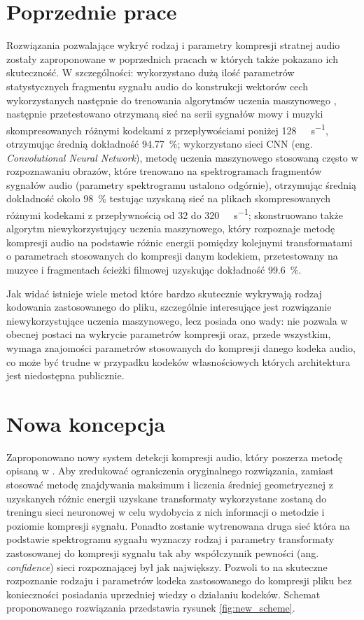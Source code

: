 \documentclass[12pt]{oska}
\let\Oldsection\section
\renewcommand{\section}{\FloatBarrier\Oldsection}
\begin{document}
\section{Poprzednie prace}
Rozwiązania pozwalające wykryć rodzaj i parametry kompresji stratnej audio
zostały zaproponowane w poprzednich pracach w których także pokazano
ich skuteczność. W szczególności: wykorzystano dużą ilość parametrów
statystycznych fragmentu sygnału audio do konstrukcji wektorów cech
wykorzystanych następnie do trenowania algorytmów uczenia maszynowego%
\cite{Hicsonmez2011AudioCI}, następnie przetestowano otrzymaną sieć na serii
sygnałów mowy i muzyki skompresowanych różnymi kodekami z przepływościami poniżej
\SI{128}{\kilo\bit\per\second}, otrzymując średnią dokładność
\SI{94.77}{\percent}\cite{Hicsonmez2013MethodsIT}; wykorzystano sieci CNN (eng.
\textit{Convolutional Neural Network}), metodę uczenia maszynowego stosowaną
często w rozpoznawaniu obrazów, które trenowano na spektrogramach fragmentów
sygnałów audio (parametry spektrogramu ustalono odgórnie), otrzymując średnią
dokładność około \SI{98}{\percent} testując uzyskaną sieć na plikach
skompresowanych różnymi kodekami z przepływnością od \num{32} do
\SI{320}{\kilo\bit\per\second}\cite{Hennequin2017CodecIL}; skonstruowano także
algorytm niewykorzystujący uczenia maszynowego, który rozpoznaje metodę
kompresji audio na podstawie różnic energii pomiędzy kolejnymi transformatami o
parametrach stosowanych do kompresji danym kodekiem, przetestowany na muzyce i
fragmentach ścieżki filmowej uzyskując dokładność
\SI{99.6}{\percent}\cite{Kim2018LossyAC}.

Jak widać istnieje wiele metod które bardzo skutecznie wykrywają rodzaj
kodowania zastosowanego do pliku, szczególnie interesujące jest rozwiązanie
niewykorzystujące uczenia maszynowego, lecz posiada ono wady: nie pozwala w
obecnej postaci na wykrycie parametrów kompresji oraz, przede wszystkim, wymaga
znajomości parametrów stosowanych do kompresji danego kodeka audio, co może być
trudne w przypadku kodeków własnościowych których architektura jest niedostępna
publicznie.
\section{Nowa koncepcja}
Zaproponowano nowy system detekcji kompresji audio, który poszerza metodę
opisaną w \cite{Kim2018LossyAC}. Aby zredukować ograniczenia oryginalnego
rozwiązania, zamiast stosować metodę znajdywania maksimum i liczenia średniej
geometrycznej z uzyskanych różnic energii uzyskane transformaty wykorzystane
zostaną do treningu sieci neuronowej w celu wydobycia z nich informacji o
metodzie i poziomie kompresji sygnału. Ponadto zostanie wytrenowana druga sieć
która na podstawie spektrogramu sygnału wyznaczy rodzaj i parametry
transformaty zastosowanej do kompresji sygnału tak aby współczynnik pewności
(ang.  \textit{confidence}) sieci rozpoznającej był jak największy.  Pozwoli to
na skuteczne rozpoznanie rodzaju i parametrów kodeka zastosowanego do kompresji
pliku bez konieczności posiadania uprzedniej wiedzy o działaniu kodeków.
Schemat proponowanego rozwiązania przedstawia rysunek \ref{fig:new_scheme}.
\end{document}
